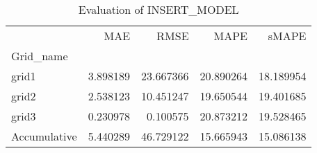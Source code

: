 \begin{table}
\centering
\caption{Evaluation of INSERT_MODEL}
\begin{tabular}{lrrrr}
\toprule
{} &       MAE &       RMSE &       MAPE &      sMAPE \\
Grid\_name    &           &            &            &            \\
\midrule
grid1        &  3.898189 &  23.667366 &  20.890264 &  18.189954 \\
grid2        &  2.538123 &  10.451247 &  19.650544 &  19.401685 \\
grid3        &  0.230978 &   0.100575 &  20.873212 &  19.528465 \\
Accumulative &  5.440289 &  46.729122 &  15.665943 &  15.086138 \\
\bottomrule
\end{tabular}
\end{table}
